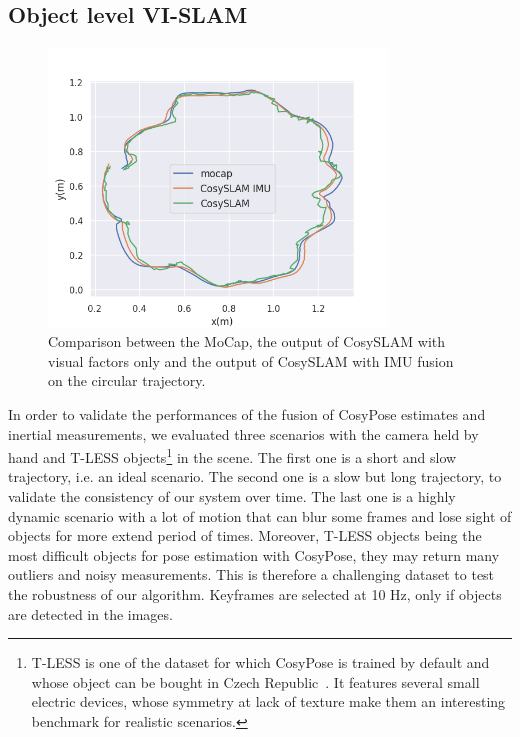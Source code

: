 \subsection{Object level VI-SLAM}

\begin{figure}%
  \centering
  \includegraphics[width=9cm]{figures/cosyslam/trajectory_circular.png}
  \caption{Comparison between the MoCap, the output of CosySLAM with visual factors only and the output of CosySLAM with IMU fusion on the circular trajectory.}
  \label{fig:traj_circular}
\end{figure}

In order to validate the performances of the fusion of CosyPose estimates and inertial measurements, we evaluated three scenarios with the camera held by hand and 
T-LESS objects\footnote{T-LESS is one of the dataset for which CosyPose is trained by default and whose object can be bought in Czech Republic~\cite{hodan17t}. 
It features several small electric devices, whose symmetry at lack of texture make them an interesting benchmark for realistic scenarios.} in the scene. 
The first one is a short and slow trajectory, i.e. an ideal scenario. The second one is a slow but long trajectory, to validate the consistency of our system over time. 
The last one is a highly dynamic scenario with a lot of motion that can blur some frames and lose sight of objects for more extend period of times. 
Moreover, T-LESS objects being the most difficult objects for pose estimation with CosyPose, they may return many outliers and noisy measurements. 
This is therefore a challenging dataset to test the robustness of our algorithm. Keyframes are selected at 10 Hz, only if objects are detected in the images.

